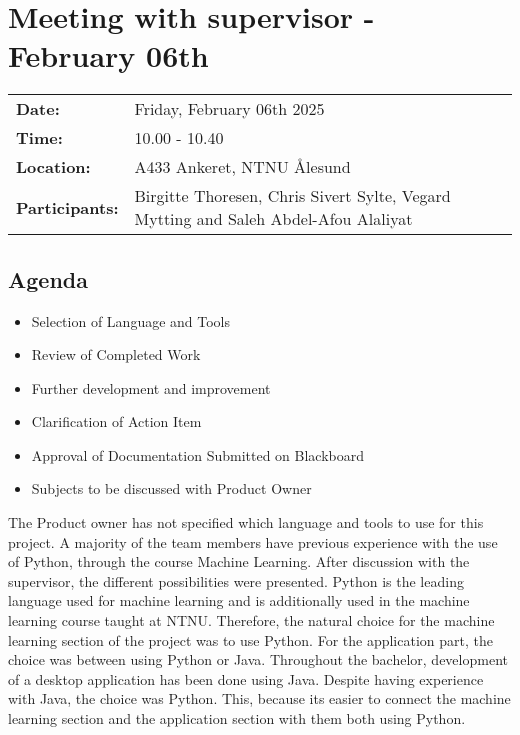 \section{Meeting with supervisor - February 06th}
\begin{tabular}{ll}
    \textbf{Date:} & Friday, February 06th 2025 \\
    \textbf{Time:} & 10.00 - 10.40\\
    \textbf{Location:} & A433 Ankeret, NTNU Ålesund \\
    \textbf{Participants:} & Birgitte Thoresen, Chris Sivert Sylte, Vegard Mytting and Saleh Abdel-Afou Alaliyat\\
\end{tabular}

\vspace{0.5cm}

\subsection{Agenda}

\begin{itemize}
    \item Selection of Language and Tools
    \item Review of Completed Work
    \item Further development and improvement
    \item Clarification of Action Item
    \item Approval of Documentation Submitted on Blackboard
    \item Subjects to be discussed with Product Owner
\end{itemize}

The Product owner has not specified which language and tools to use for this project. A majority of the team members have previous experience with the use of Python, through the course Machine Learning. After discussion with the supervisor, the different possibilities were presented. Python is the leading language used for machine learning and is additionally used in the machine learning course taught at NTNU. Therefore, the natural choice for the machine learning section of the project was to use Python. For the application part, the choice was between using Python or Java. Throughout the bachelor, development of a desktop application has been done using Java. Despite having experience with Java, the choice was Python. This, because its easier to connect the machine learning section and the application section with them both using Python. \\

